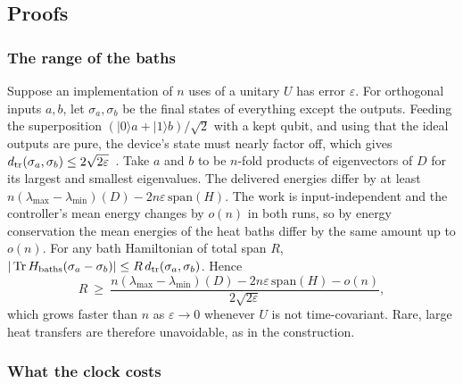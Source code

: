 \subsection{Proofs}\label{kt:app:proofs}

\subsubsection{The range of the baths}\label{kt:pf:baths}

Suppose an implementation of $n$ uses of a unitary $U$ has error $\varepsilon$. For orthogonal inputs $a,b$, let $\sigma_a,\sigma_b$ be the final states of everything except the outputs. Feeding the superposition $(|0\rangle a+|1\rangle b)/\sqrt2$ with a kept qubit, and using that the ideal outputs are pure, the device's state must nearly factor off, which gives $d_{\rm tr}(\sigma_a,\sigma_b)\le2\sqrt{2\varepsilon}$~\cite{KSW08}. Take $a$ and $b$ to be $n$-fold products of eigenvectors of $D$ for its largest and smallest eigenvalues. The delivered energies differ by at least $n(\lambda_{\max}-\lambda_{\min})(D)-2n\varepsilon\,\mathrm{span}(H)$. The work is input-independent and the controller's mean energy changes by $o(n)$ in both runs, so by energy conservation the mean energies of the heat baths differ by the same amount up to $o(n)$. For any bath Hamiltonian of total span $R$, $|\operatorname{Tr} H_{\mathrm{baths}}(\sigma_a-\sigma_b)|\le R\,d_{\rm tr}(\sigma_a,\sigma_b)$. Hence
\[
R\ \ge\ \frac{n(\lambda_{\max}-\lambda_{\min})(D)-2n\varepsilon\,\mathrm{span}(H)-o(n)}{2\sqrt{2\varepsilon}},
\]
which grows faster than $n$ as $\varepsilon\to0$ whenever $U$ is not time-covariant. Rare, large heat transfers are therefore unavoidable, as in the construction.



\subsubsection{What the clock costs}\label{kt:pf:costs}

